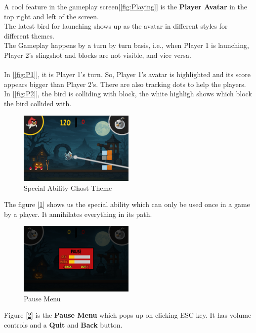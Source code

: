 \documentclass{article}
\begin{document}
A cool feature in the gameplay screen[\ref{fig:Playing}] is the \textbf{Player Avatar} in the top right and left of the screen.\\
The latest bird for launching shows up as the avatar in different styles for different themes.\\
The Gameplay happens by a turn by turn basis, i.e., when Player 1 is launching, Player 2's slingshot and blocks are not visible, and vice versa.\\
\\In [\ref{fig:P1}], it is Player 1's turn. So, Player 1's avatar is highlighted and its score appears bigger than Player 2's. There are also tracking dots to help the players.\\
In [\ref{fig:P2}], the bird is colliding with block, the white highligh shows which block the bird collided with.
\\
\begin{figure}[h]
    \centering
    \includegraphics[width=0.5\textwidth]{Special.png}
    \caption{Special Ability Ghost Theme}\label{fig:Special}
\end{figure}

The figure [\ref{fig:Special}] shows us the special ability which can only be used once in a game by a player. It annihilates everything in its path.


\begin{figure}[h]
    \centering
    \includegraphics[width=0.5\textwidth]{Pause.png}
    \caption{Pause Menu}\label{fig:Pause}
\end{figure}
Figure [\ref{fig:Pause}] is the \textbf{Pause Menu} which pops up on clicking ESC key. It has volume controls and a \textbf{Quit} and \textbf{Back} button.
\end{document}
